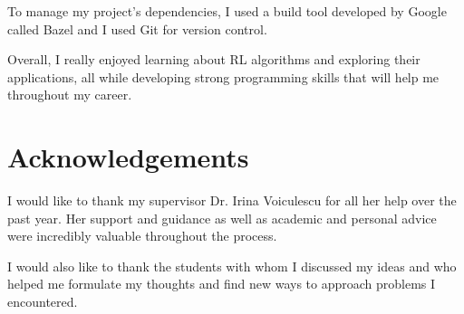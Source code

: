 \documentclass[11pt,a4paper]{report}
\begin{document}
To manage my project's dependencies, I used a build tool developed by Google called Bazel and I used Git for version control.

Overall, I really enjoyed learning about RL algorithms and exploring their applications, all while developing strong programming skills that will help me throughout my career.


\chapter{Acknowledgements}

I would like to thank my supervisor Dr. Irina Voiculescu for all her help over the past year. Her support and guidance as well as academic and personal advice were incredibly valuable throughout the process.

I would also like to thank the students with whom I discussed my ideas and who helped me formulate my thoughts and find new ways to approach problems I encountered.


{}

\end{document}
